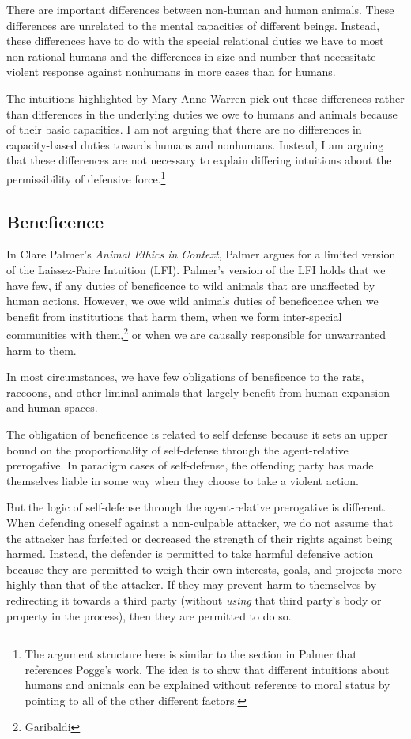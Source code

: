 \documentclass[12pt]{book}
\begin{document}
    There are important differences between non-human and human animals.
    These differences are unrelated to the mental capacities of different
    beings. Instead, these differences have to do with the special relational
    duties we have to most non-rational humans and the differences in size and
    number that necessitate violent response against nonhumans in more cases
    than for humans.

	The intuitions highlighted by Mary Anne Warren pick out these differences
	rather than differences in the underlying duties we owe to humans and
	animals because of their basic capacities. I am not arguing that there are
	no differences in capacity-based duties towards humans and nonhumans.
	Instead, I am arguing that these differences are not necessary to explain
	differing intuitions about the permissibility of defensive
	force.\footnote{The argument structure here is similar to the section in
		Palmer that references Pogge’s work. The idea is to show that different
	intuitions about humans and animals can be explained without reference to
	moral status by pointing to all of the other different factors.}

    \subsection{Beneficence}

		In Clare Palmer’s \emph{Animal Ethics in Context}, Palmer argues for a
		limited version of the Laissez-Faire Intuition (LFI). Palmer’s version
		of the LFI holds that we have few, if any duties of beneficence to wild
		animals that are unaffected by human actions. However, we owe wild
		animals duties of beneficence when we benefit from institutions that
		harm them, when we form inter-special communities with
		them,\footnote{Garibaldi} or when we are causally responsible for
		unwarranted harm to them.

		In most circumstances, we have few obligations of beneficence to the
		rats, raccoons, and other liminal animals that largely benefit from
		human expansion and human spaces.

		The obligation of beneficence is related to self defense because it sets
		an upper bound on the proportionality of self-defense through the
		agent-relative prerogative. In paradigm cases of self-defense, the
		offending party has made themselves liable in some way when they choose
		to take a violent action.

		But the logic of self-defense through the agent-relative prerogative is
		different. When defending oneself against a non-culpable attacker, we do
		not assume that the attacker has forfeited or decreased the strength
		of their rights against being harmed. Instead, the defender is
		permitted to take harmful defensive action because they are permitted
		to weigh their own interests, goals, and projects more highly than that
		of the attacker. If they may prevent harm to themselves by redirecting
		it towards a third party (without \emph{using} that third party’s body
		or property in the process), then they are permitted to do so.
\end{document}
